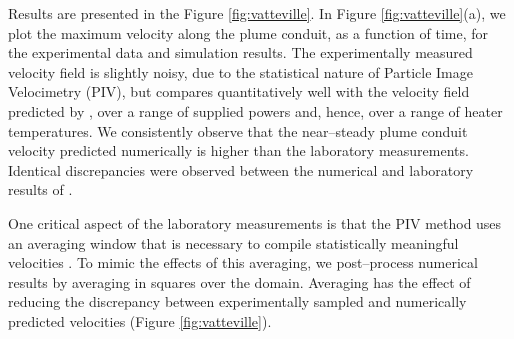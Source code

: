 Results are presented in the Figure \ref{fig:vatteville}. In Figure
\ref{fig:vatteville}(a), we plot the maximum velocity along the plume
conduit, as a function of time, for the experimental data and simulation results. 
The experimentally measured
velocity field is slightly noisy, due to the statistical nature of
Particle Image Velocimetry (PIV), but compares quantitatively well
with the velocity field predicted by \TF{}, over a range of supplied
powers and, hence, over a range of heater temperatures. We
consistently observe that the near--steady plume conduit velocity
predicted numerically is higher than the laboratory
measurements. Identical discrepancies were observed between the
numerical and laboratory results of \citet{VattevilleG32009}.

One critical aspect of the laboratory measurements is that the PIV
method uses an averaging window that is necessary to compile
statistically meaningful velocities \citep[see][for further
details]{VattevilleG32009}. To mimic the effects of this averaging, we
post--process numerical results by averaging in \mm[3] squares over
the domain.  
Averaging has the effect of reducing the
discrepancy between experimentally sampled and numerically predicted
velocities (Figure \ref{fig:vatteville}).

